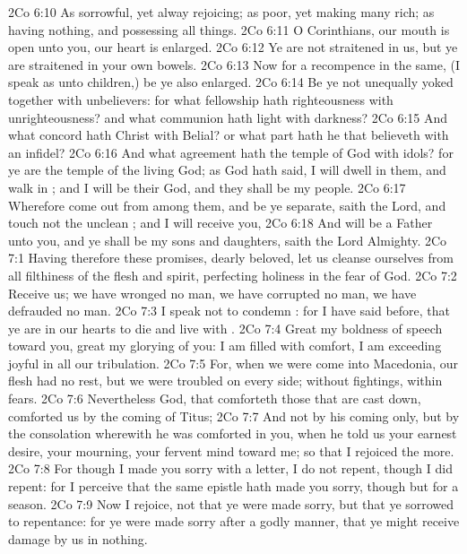 \vs 2Co 6:10 As sorrowful, yet alway rejoicing; as poor, yet making many rich; as having nothing, and  possessing all things.
\vs 2Co 6:11 O  Corinthians, our mouth is open unto you, our heart is enlarged.
\vs 2Co 6:12 Ye are not straitened in us, but ye are straitened in your own bowels.
\vs 2Co 6:13 Now for a recompence in the same, (I speak as unto  children,) be ye also enlarged.
\vs 2Co 6:14 Be ye not unequally yoked together with unbelievers: for what fellowship hath righteousness with unrighteousness? and what communion hath light with darkness?
\vs 2Co 6:15 And what concord hath Christ with Belial? or what part hath he that believeth with an infidel?
\vs 2Co 6:16 And what agreement hath the temple of God with idols? for ye are the temple of the living God; as God hath said, I will dwell in them, and walk in ; and I will be their God, and they shall be my people.
\vs 2Co 6:17 Wherefore come out from among them, and be ye separate, saith the Lord, and touch not the unclean ; and I will receive you,
\vs 2Co 6:18 And will be a Father unto you, and ye shall be my sons and daughters, saith the Lord Almighty.
\vs 2Co 7:1 Having therefore these promises, dearly beloved, let us cleanse ourselves from all filthiness of the flesh and spirit, perfecting holiness in the fear of God.
\vs 2Co 7:2 Receive us; we have wronged no man, we have corrupted no man, we have defrauded no man.
\vs 2Co 7:3 I speak not  to condemn : for I have said before, that ye are in our hearts to die and live with .
\vs 2Co 7:4 Great  my boldness of speech toward you, great  my glorying of you: I am filled with comfort, I am exceeding joyful in all our tribulation.
\vs 2Co 7:5 For, when we were come into Macedonia, our flesh had no rest, but we were troubled on every side; without  fightings, within  fears.
\vs 2Co 7:6 Nevertheless God, that comforteth those that are cast down, comforted us by the coming of Titus;
\vs 2Co 7:7 And not by his coming only, but by the consolation wherewith he was comforted in you, when he told us your earnest desire, your mourning, your fervent mind toward me; so that I rejoiced the more.
\vs 2Co 7:8 For though I made you sorry with a letter, I do not repent, though I did repent: for I perceive that the same epistle hath made you sorry, though  but for a season.
\vs 2Co 7:9 Now I rejoice, not that ye were made sorry, but that ye sorrowed to repentance: for ye were made sorry after a godly manner, that ye might receive damage by us in nothing.
